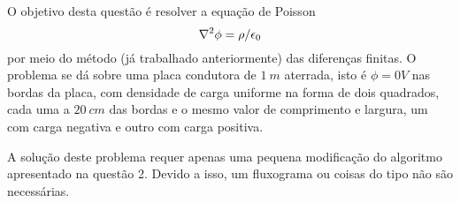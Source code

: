 



  O objetivo desta questão é resolver a equação de Poisson
  \begin{equation*}
    \laplacian{\phi} = \rho / \epsilon_0
  \end{equation*}
  por meio do método (já trabalhado anteriormente) das diferenças finitas. O problema se dá sobre uma placa condutora de $1 \ m$ aterrada, isto é $\phi = 0 V$ nas bordas da placa, com densidade de carga uniforme na forma de dois quadrados, cada uma a $20 \ cm$ das bordas e o mesmo valor de comprimento e largura, um com carga negativa e outro com carga positiva.

  A solução deste problema requer apenas uma pequena modificação do algoritmo apresentado na questão 2. Devido a isso, um fluxograma ou coisas do tipo não são necessárias.







